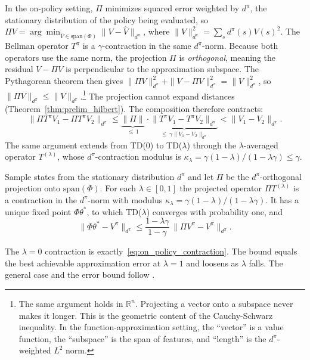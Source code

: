 In the on-policy setting, $\Pi$ minimizes squared error weighted by $d^\pi$, the stationary distribution of the policy being evaluated, so $\Pi V = \arg\min_{\hat{V} \in \text{span}(\Phi)} \|V - \hat{V}\|_{d^\pi}$, where $\|V\|_{d^\pi}^2 = \sum_s d^\pi(s) V(s)^2$. The Bellman operator $T^\pi$ is a $\gamma$-contraction in the same $d^\pi$-norm. Because both operators use the same norm, the projection $\Pi$ is \emph{orthogonal}, meaning the residual $V - \Pi V$ is perpendicular to the approximation subspace. The Pythagorean theorem then gives $\|\Pi V\|_{d^\pi}^2 + \|V - \Pi V\|_{d^\pi}^2 = \|V\|_{d^\pi}^2$, so $\|\Pi V\|_{d^\pi} \leq \|V\|_{d^\pi}$.\footnote{The same argument holds in $\mathbb{R}^n$. Projecting a vector onto a subspace never makes it longer. This is the geometric content of the Cauchy-Schwarz inequality. In the function-approximation setting, the ``vector'' is a value function, the ``subspace'' is the span of features, and ``length'' is the $d^\pi$-weighted $L^2$ norm.} The projection cannot expand distances (Theorem~\ref{thm:prelim_hilbert}). The composition therefore contracts:
\begin{equation}
\|\Pi T^\pi V_1 - \Pi T^\pi V_2\|_{d^\pi} \leq \underbrace{\|\Pi\|}_{\leq\, 1} \cdot \underbrace{\|T^\pi V_1 - T^\pi V_2\|_{d^\pi}}_{\leq\, \gamma \|V_1 - V_2\|_{d^\pi}} < \|V_1 - V_2\|_{d^\pi}.
\label{eq:on_policy_contraction}
\end{equation}
The same argument extends from TD(0) to TD($\lambda$) through the $\lambda$-averaged operator $T^{(\lambda)}$, whose $d^\pi$-contraction modulus is $\kappa_\lambda = \gamma(1-\lambda)/(1-\lambda\gamma) \leq \gamma$.

\begin{theorem}
\label{thm:proj_bellman}
Sample states from the stationary distribution $d^\pi$ and let $\Pi$ be the $d^\pi$-orthogonal projection onto $\mathrm{span}(\Phi)$. For each $\lambda \in [0,1]$ the projected operator $\Pi T^{(\lambda)}$ is a contraction in the $d^\pi$-norm with modulus $\kappa_\lambda = \gamma(1-\lambda)/(1-\lambda\gamma)$. It has a unique fixed point $\Phi\theta^*$, to which TD($\lambda$) converges with probability one, and
\[
\|\Phi\theta^* - V^\pi\|_{d^\pi} \leq \frac{1-\lambda\gamma}{1-\gamma}\, \|\Pi V^\pi - V^\pi\|_{d^\pi}.
\]
\end{theorem}

The $\lambda = 0$ contraction is exactly~\eqref{eq:on_policy_contraction}. The bound equals the best achievable approximation error at $\lambda = 1$ and loosens as $\lambda$ falls. The general case and the error bound follow \citep[Theorem~1]{tsitsiklis1997}.

